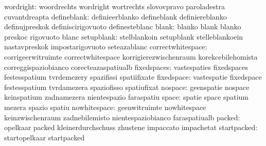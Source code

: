                        wordright: woordrechts                      wordright
                                  wortrechts                       slovovpravo
                                  paroladestra                     cuvantdreapta
                     defineblank: definieerblanko                  defineblank
                                  definiereblanko                  definujpreskok
                                  definiscirigovuoto               definesteblanc
                           blank: blanko                           blank
                                  blanko                           preskoc
                                  rigovuoto                        blanc
                      setupblank: stelblankoin                     setupblank
                                  stelleblankoein                  nastavpreskok
                                  impostarigovuoto                 seteazablanc
               correctwhitespace: corrigeerwitruimte               correctwhitespace
                                  korrigierezwischenraum           korekcebilehomista
                                  correggispaziobianco             corecteazaspatiualb
                     fixedspaces: vastespaties                     fixedspaces
                                  festesspatium                    tvrdemezery
                                  spazifissi                       spatiifixate
                      fixedspace: vastespatie                      fixedspace
                                  festesspatium                    tvrdamezera
                                  spaziofisso                      spatiufixat
                         nospace: geenspatie                       nospace
                                  keinspatium                      zadnamezera
                                  nientespazio                     faraspatiu
                           space: spatie                           space
                                  spatium                          mezera
                                  spazio                           spatiu
                    nowhitespace: geenwitruimte                    nowhitespace
                                  keinzwischenraum                 zadnebilemisto
                                  nientespaziobianco               faraspatiualb
                          packed: opelkaar                         packed
                                  kleinerdurchschuss               zhustene
                                  impaccato                        impachetat
                     startpacked: startopelkaar                    startpacked
